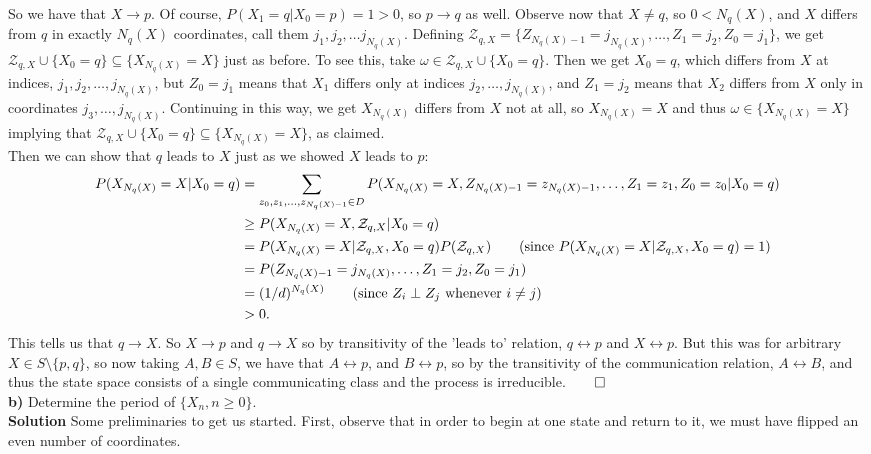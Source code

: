\documentclass[11pt, letterpaper]{article}
\newcommand{\mc}[1]{\mathcal{#1}}
\begin{document}
    So we have that $X\longrightarrow p$. Of course, $P(X_1=q|X_0=p)=1>0$, so $p\longrightarrow q$ as well. Observe now that $X\neq q$, so $0<N_q(X)$, and $X$ differs from $q$ in exactly $N_q(X)$ coordinates,
    call them $j_1,j_2,\dots j_{N_q(X)}$. Defining $\mc{Z}_{q,X}=\{Z_{N_q(X)-1}=j_{N_q(X)},\dots,Z_1=j_2,Z_0=j_1\}$, we get $\mc{Z}_{q,X}\cup\{X_0=q\}\subseteq \{X_{N_q(X)}=X\}$ just as before. To see this, take $\omega\in\mc{Z}_{q,X}\cup\{X_0=q\}$. Then we get
    $X_0=q$, which differs from $X$ at indices, $j_1,j_2,\dots,j_{N_q(X)}$, but $Z_0=j_1$ means that $X_1$ differs only at indices $j_2,\dots,j_{N_q(X)}$, and $Z_1=j_2$ means that $X_2$ differs from $X$ only in coordinates $j_3,\dots,j_{N_q(X)}$. Continuing in this way, we get
    $X_{N_q(X)}$ differs from $X$ not at all, so $X_{N_q(X)}=X$  and thus $\omega\in \{X_{N_q(X)}=X\}$ implying that $\mc{Z}_{q,X}\cup\{X_0=q\}\subseteq\{X_{N_q(X)}=X\}$, as claimed.\\[10pt]
    Then we can show that $q$ leads to $X$ just as we showed $X$ leads to $p$:
    \begin{align*}
        P(X_{N_q(X)}=X|X_0=q)&=\sum_{z_0,z_1,\dots,z_{N_q(X)-1}\in D}P(X_{N_q(X)}=X,Z_{N_q(X)-1}=z_{N_q(X)-1},\dots,Z_1=z_1,Z_0=z_0|X_0=q)\\
        &\geq P(X_{N_q(X)}=X,\mc{Z}_{q,X}|X_0=q)\\
        &=P(X_{N_q(X)}=X|\mc{Z}_{q,X},X_0=q)P(\mc{Z}_{q,X})\tag{since $P(X_{N_q(X)}=X|\mc{Z}_{q,X},X_0=q)=1$}\\
        &=P(Z_{N_q(X)-1}=j_{N_q(X)},\dots,Z_1=j_2,Z_0=j_1)\\
        &=(1/d)^{N_q(X)}\tag{since $Z_i\perp Z_j$ whenever $i\neq j$}\\
        &>0.
    \end{align*}
    This tells us that $q\longrightarrow X$. So $X\longrightarrow p$ and $q\longrightarrow X$ so by transitivity of the 'leads to' relation, $q\longleftrightarrow p$ and $X\longleftrightarrow p$. But this was for arbitrary $X\in S\setminus\{p,q\}$, so now taking $A,B\in S$, we have that $A\longleftrightarrow p$, and $B\longleftrightarrow p$,
    so by the transitivity of the communication relation, $A\longleftrightarrow B$, and thus the state space consists of a single communicating class and the process is irreducible.\hfill{$\qed$}\\[10pt]
    {\bf b)} Determine the period of $\{X_n,n\geq 0\}$.\\[10pt]
    {\bf Solution} Some preliminaries to get us started. First, observe that in order to begin at one state and return to it, we must have flipped an even number of coordinates. 
\end{document}
